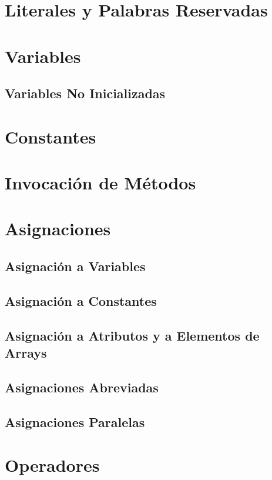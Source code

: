 \section{Literales y Palabras Reservadas}

\section{Variables}

  \subsection{Variables No Inicializadas}

\section{Constantes}

\section{Invocación de Métodos}

\section{Asignaciones}

  \subsection{Asignación a Variables}
  \subsection{Asignación a Constantes}
  \subsection{Asignación a Atributos y a Elementos de Arrays}
  \subsection{Asignaciones Abreviadas}
  \subsection{Asignaciones Paralelas}

\section{Operadores}
